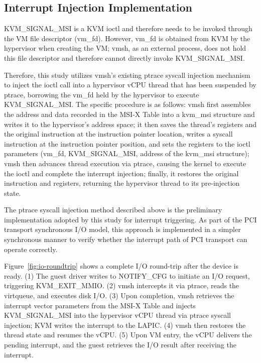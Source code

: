 \begin{ZhChapter}
\subsection{Interrupt Injection Implementation}
\label{sec:injection-impl}

KVM\_SIGNAL\_MSI is a KVM ioctl and therefore needs to be invoked through the VM file descriptor (vm\_fd). However, vm\_fd is obtained from KVM by the hypervisor when creating the VM; vmsh, as an external process, does not hold this file descriptor and therefore cannot directly invoke KVM\_SIGNAL\_MSI.

\begin{sloppypar}
Therefore, this study utilizes vmsh's existing ptrace syscall injection mechanism to inject the ioctl call into a hypervisor vCPU thread that has been suspended by ptrace, borrowing the vm\_fd held by the hypervisor to execute KVM\_SIGNAL\_MSI. The specific procedure is as follows: vmsh first assembles the address and data recorded in the MSI-X Table into a kvm\_msi structure and writes it to the hypervisor's address space; it then saves the thread's registers and the original instruction at the instruction pointer location, writes a syscall instruction at the instruction pointer position, and sets the registers to the ioctl parameters (vm\_fd, KVM\_SIGNAL\_MSI, address of the kvm\_msi structure); vmsh then advances thread execution via ptrace, causing the kernel to execute the ioctl and complete the interrupt injection; finally, it restores the original instruction and registers, returning the hypervisor thread to its pre-injection state.
\end{sloppypar}

The ptrace syscall injection method described above is the preliminary implementation adopted by this study for interrupt triggering. As part of the PCI transport synchronous I/O model, this approach is implemented in a simpler synchronous manner to verify whether the interrupt path of PCI transport can operate correctly.

Figure~\ref{fig:io-roundtrip} shows a complete I/O round-trip after the device is ready. (1) The guest driver writes to NOTIFY\_CFG to initiate an I/O request, triggering KVM\_EXIT\_MMIO. (2) vmsh intercepts it via ptrace, reads the virtqueue, and executes disk I/O. (3) Upon completion, vmsh retrieves the interrupt vector parameters from the MSI-X Table and injects KVM\_SIGNAL\_MSI into the hypervisor vCPU thread via ptrace syscall injection; KVM writes the interrupt to the LAPIC. (4) vmsh then restores the thread state and resumes the vCPU. (5) Upon VM entry, the vCPU delivers the pending interrupt, and the guest retrieves the I/O result after receiving the interrupt.


\end{ZhChapter}
